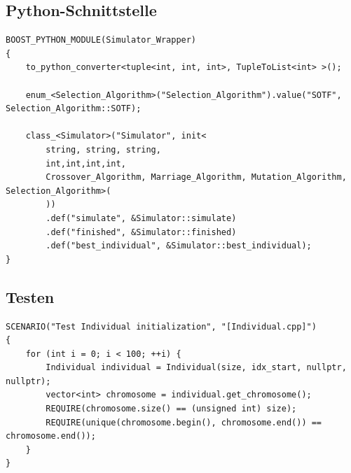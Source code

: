 \subsection{Python-Schnittstelle}
\begin{minipage}{\linewidth}
\begin{lstlisting}[caption={C++ zu Python Schnittstelle}, firstnumber=1, captionpos=b, label=lst:boostpython]
BOOST_PYTHON_MODULE(Simulator_Wrapper)
{
	to_python_converter<tuple<int, int, int>, TupleToList<int> >();

	enum_<Selection_Algorithm>("Selection_Algorithm").value("SOTF", Selection_Algorithm::SOTF);

	class_<Simulator>("Simulator", init<
		string, string, string,
		int,int,int,int,
		Crossover_Algorithm, Marriage_Algorithm, Mutation_Algorithm, Selection_Algorithm>(
		))
 		.def("simulate", &Simulator::simulate)
		.def("finished", &Simulator::finished)
		.def("best_individual", &Simulator::best_individual);
}
\end{lstlisting}
\end{minipage}
\subsection{Testen}
\begin{minipage}{\linewidth}
\begin{lstlisting}[caption={Unit-Tests}, firstnumber=1, captionpos=b, label=lst:tests]
SCENARIO("Test Individual initialization", "[Individual.cpp]")
{
	for (int i = 0; i < 100; ++i) {
		Individual individual = Individual(size, idx_start, nullptr, nullptr);
		vector<int> chromosome = individual.get_chromosome();
		REQUIRE(chromosome.size() == (unsigned int) size);
		REQUIRE(unique(chromosome.begin(), chromosome.end()) == chromosome.end());
	}
}
\end{lstlisting}
\end{minipage}
